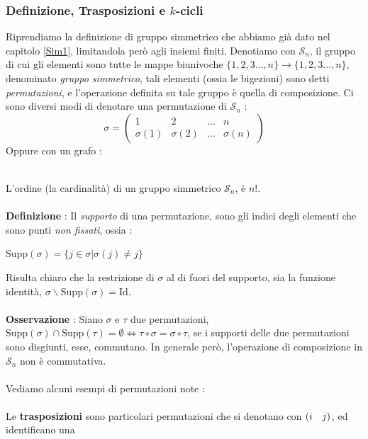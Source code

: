 \documentclass[12pt, letterpaper]{article}
\newcommand{\Sn}{{\mathcal S_n}}
\newcommand{\spaz}{{\text{\hphantom{aa}}}}
\newcommand{\supp}{{\text{Supp}}}
\newcommand{\acc}{\\\hphantom{}\\}
\begin{document}
\subsubsection{Definizione, Trasposizioni e \(k\)-cicli}
Riprendiamo la definizione di gruppo simmetrico che abbiamo già dato nel capitolo \ref{Sim1}, limitandola 
però agli insiemi finiti. Denotiamo con \(\Sn\), il gruppo di cui gli elementi sono 
tutte le mappe biunivoche \(\{1,2,3\dots,n\}\rightarrow\{1,2,3\dots,n\} \), denominato \textit{gruppo simmetrico}, 
tali elementi (ossia le bigezioni) sono detti \textit{permutazioni}, e l'operazione definita su tale gruppo 
è quella di composizione. Ci sono diversi modi di denotare una permutazione di \(\Sn\) : \begin{equation}
    \sigma=\begin{pmatrix}
        1 & 2 & \dots&n\\
        \sigma(1) & \sigma(2) & \dots&\sigma(n)
        \end{pmatrix}
\end{equation}
Oppure con un grafo :
\begin{figure}[h]
\end{figure}\\
L'ordine (la cardinalità) di un gruppo simmetrico \(\Sn\), è \(n!\).\acc
\textbf{Definizione }: Il \textit{supporto} di una permutazione, sono gli indici degli elementi  
che sono punti \textit{non fissati}, ossia : \begin{center}\(\supp(\sigma)=\{j\in\sigma | \sigma(j)\ne j\}\)\end{center}
Risulta chiaro che la restrizione di \(\sigma\) al di fuori del supporto, sia la funzione identità, \(\sigma\backslash\supp(\sigma)=\text{Id}\).\acc
\textbf{Osservazione }: Siano \(\sigma\) e \(\tau \) due permutazioni, \(\supp(\sigma)\cap\supp(\tau)=\emptyset\iff \tau\circ\sigma = \sigma \circ \tau\), se 
i supporti delle due permutazioni sono disgiunti, esse, commutano. In generale però, l'operazione di composizione 
in \(\Sn\) non è commutativa.\acc
Vediamo alcuni esempi di permutazioni note : \acc 
Le \textbf{trasposizioni} sono particolari permutazioni che si denotano con \((i\spaz{ }j)\), ed identificano una 
\end{document}
